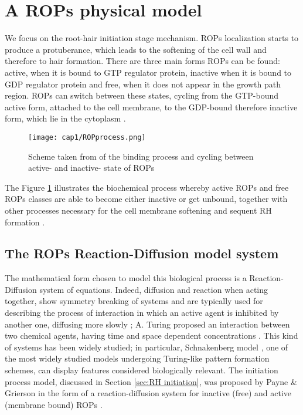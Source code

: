 \section{A ROPs physical model}
We focus on the root-hair initiation stage mechanism. ROPs localization starts to produce a protuberance, which leads to the softening of the cell wall and therefore to hair formation. There are three main forms ROPs can be found: active, when it is bound to GTP regulator protein, inactive when it is bound to GDP regulator protein and free, when it does not appear in the growth path region. ROPs can switch between these states, cycling from  the GTP-bound  active form, attached to the cell membrane, to the GDP-bound therefore inactive form, which lie in the cytoplasm  \cite{phd:67_hill, intra2:12_GTP}.

\begin{figure}
  \centering
  \texttt{[image: cap1/ROPprocess.png]}
  \caption{Scheme taken from \cite{phdthesis:victor} of the binding process and cycling between active- and inactive- state of ROPs}
  \label{fig:process}
\end{figure}

The Figure \ref{fig:process} illustrates the biochemical process whereby active ROPs and free ROPs classes are able to become either inactive or get unbound, together with other processes necessary for the cell membrane softening and sequent RH formation \cite{phd:97_airop}.

\subsection{The ROPs Reaction-Diffusion model system} \label{sec:intromodel}

The mathematical form chosen to model this biological process is a Reaction-Diffusion system of equations. Indeed, diffusion and reaction when acting together, show symmetry breaking of systems and are typically used for describing the process of interaction in which an active agent is inhibited by another one, diffusing more slowly \cite{phd:97_airop}; A. Turing proposed an interaction between two chemical agents, having time and space dependent concentrations \cite{phd:131_turing}. This kind of systems has been widely studied; in particular, Schnakenberg model \cite{vic:Schnak}, one of the most widely studied models undergoing Turing-like pattern formation schemes, can display features considered biologically relevant. The initiation process  model, discussed in Section \ref{sec:RH initiation}, was proposed by Payne \& Grierson \cite{payne} in the form of a reaction-diffusion system for inactive (free) and active (membrane bound) ROPs \cite{intra2:15_Schnak}.


